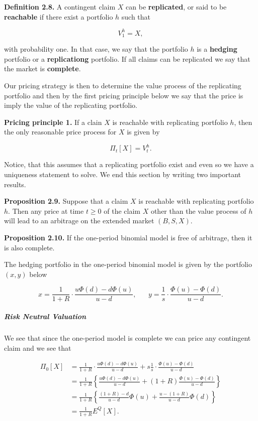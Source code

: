 \documentclass[
]{article}
\begin{document}
\textbf{Definition 2.8.} A contingent claim \(X\) can be
\textbf{replicated}, or said to be \textbf{reachable} if there exist a
portfolio \(h\) such that

\[
V_1^h=X,
\]

with probability one. In that case, we say that the portfolio \(h\) is a
\textbf{hedging} portfolio or a \textbf{replicationg} portfolio. If all
claims can be replicated we say that the market is \textbf{complete}.

Our pricing strategy is then to determine the value process of the
replicating portfolio and then by the first pricing principle below we
say that the price is imply the value of the replicating portfolio.

\textbf{Pricing principle 1.} If a clain \(X\) is reachable with
replicating portfolio \(h\), then the only reasonable price process for
\(X\) is given by

\[
\Pi_t[X]=V_t^h.
\]

Notice, that this assumes that a replicating portfolio exist and even so
we have a uniqueness statement to solve. We end this section by writing
two important results.

\textbf{Proposition 2.9.} Suppose that a claim \(X\) is reachable with
replicating portfolio \(h\). Then any price at time \(t\ge 0\) of the
claim \(X\) other than the value process of \(h\) will lead to an
arbitrage on the extended market \((B,S,X)\).

\textbf{Proposition 2.10.} If the one-period binomial model is free of
arbitrage, then it is also complete.

The hedging portfolio in the one-period binomial model is given by the
portfolio \((x,y)\) below

\[
x=\frac{1}{1+R}\cdot\frac{u\Phi(d)-d\Phi(u)}{u-d},\hspace{20pt}y=\frac{1}{s}\cdot\frac{\Phi(u)-\Phi(d)}{u-d}.
\]

\hypertarget{risk-neutral-valuation}{%
\subparagraph{Risk Neutral Valuation}\label{risk-neutral-valuation}}

We see that since the one-period model is complete we can price any
contingent claim and we see that

\begin{align*}
\Pi_0[X]&=\frac{1}{1+R}\cdot\frac{u\Phi(d)-d\Phi(u)}{u-d}+s\frac{1}{s}\cdot\frac{\Phi(u)-\Phi(d)}{u-d}\\
&=\frac{1}{1+R}\left\{\frac{u\Phi(d)-d\Phi(u)}{u-d}+(1+R)\frac{\Phi(u)-\Phi(d)}{u-d}\right\}\\
&=\frac{1}{1+R}\left\{\frac{(1+R)-d}{u-d}\Phi(u)+\frac{u-(1+R)}{u-d}\Phi(d)\right\}\\
&=\frac{1}{1+R}E^Q[X].
\end{align*}
\end{document}
